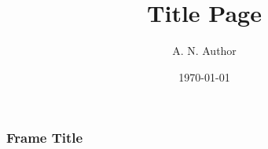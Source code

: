 \documentclass[hyperref=hidelinks]{beamer}
\title{Title Page}
\author{A. N. Author}
\date{\today}
\begin{document}
\begin{frame}
    \titlepage
\end{frame}

\begin{frame}
    \frametitle{Frame Title}
\end{frame}
\end{document}
